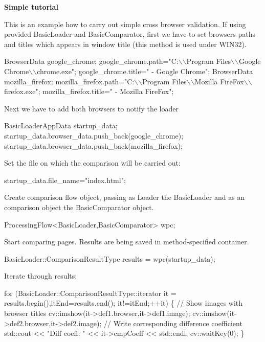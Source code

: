 \par
\par
 {\bfseries Simple tutorial}\par
 This is an example how to carry out simple cross browser validation. If using provided Basic\-Loader and Basic\-Comparator, first we have to set browsers paths and titles which appears in window title (this method is used under W\-I\-N32). 
\begin{DoxyCode}
BrowserData google\_chrome;
google\_chrome.path=\textcolor{stringliteral}{"C:\(\backslash\)\(\backslash\)Program Files\(\backslash\)\(\backslash\)Google Chrome\(\backslash\)\(\backslash\)chrome.exe"};
google\_chrome.title=\textcolor{stringliteral}{" - Google Chrome"};
BrowserData mozilla\_firefox;
mozilla\_firefox.path=\textcolor{stringliteral}{"C:\(\backslash\)\(\backslash\)Program Files\(\backslash\)\(\backslash\)Mozilla FireFox\(\backslash\)\(\backslash\)firefox.exe"};
mozilla\_firefox.title=\textcolor{stringliteral}{" - Mozilla FireFox"};
\end{DoxyCode}
 Next we have to add both browsers to notify the loader 
\begin{DoxyCode}
BasicLoaderAppData startup\_data;
startup\_data.browser\_data.push\_back(google\_chrome);
startup\_data.browser\_data.push\_back(mozilla\_firefox);
\end{DoxyCode}
 Set the file on which the comparison will be carried out\-: 
\begin{DoxyCode}
startup\_data.file\_name=\textcolor{stringliteral}{"index.html"};
\end{DoxyCode}
 Create comparison flow object, passing as Loader the Basic\-Loader and as an comparison object the Basic\-Comparator object. 
\begin{DoxyCode}
ProcessingFlow<BasicLoader,BasicComparator> wpc;
\end{DoxyCode}
 Start comparing pages. Results are being saved in method-\/specified container. 
\begin{DoxyCode}
BasicLoader::ComparisonResultType results = wpc(startup\_data);
\end{DoxyCode}
 Iterate through results\-: 
\begin{DoxyCode}
\textcolor{keywordflow}{for} (BasicLoader::ComparisonResultType::iterator it = results.begin(),itEnd=results.end();
    it!=itEnd;++it)
    \{
        \textcolor{comment}{// Show images with browser titles}
        cv::imshow(it->def1.browser,it->def1.image);
        cv::imshow(it->def2.browser,it->def2.image);
        \textcolor{comment}{//  Write corresponding difference coefficient}
        std::cout << \textcolor{stringliteral}{"Diff coeff: "} << it->cmpCoeff << std::endl;
        cv::waitKey(0);
    \}
\end{DoxyCode}
 
